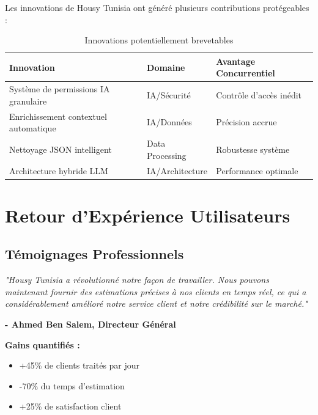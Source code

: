 Les innovations de Housy Tunisia ont généré plusieurs contributions protégeables :

\begin{table}[H]
\centering
\caption{Innovations potentiellement brevetables}
\begin{tabular}{|l|l|l|}
\hline
\textbf{Innovation} & \textbf{Domaine} & \textbf{Avantage Concurrentiel} \\
\hline
Système de permissions IA granulaire & IA/Sécurité & Contrôle d'accès inédit \\
\hline
Enrichissement contextuel automatique & IA/Données & Précision accrue \\
\hline
Nettoyage JSON intelligent & Data Processing & Robustesse système \\
\hline
Architecture hybride LLM & IA/Architecture & Performance optimale \\
\hline
\end{tabular}
\end{table}

\section{Retour d'Expérience Utilisateurs}

\subsection{Témoignages Professionnels}

\begin{tcolorbox}[colback=blue!5!white,colframe=blue!75!black,title=Témoignage - Agence Immobilière "Tunis Properties"]
\textit{"Housy Tunisia a révolutionné notre façon de travailler. Nous pouvons maintenant fournir des estimations précises à nos clients en temps réel, ce qui a considérablement amélioré notre service client et notre crédibilité sur le marché."}

\textbf{- Ahmed Ben Salem, Directeur Général}

\textbf{Gains quantifiés :}
\begin{itemize}
    \item +45\% de clients traités par jour
    \item -70\% du temps d'estimation
    \item +25\% de satisfaction client
\end{itemize}
\end{tcolorbox}

